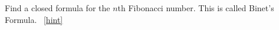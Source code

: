 \documentclass{book}
\begin{document}
\setcounter{project}{150}
\addtocounter{project}{-1}
\begin{activity}[]\label{act-binet}
\hypertarget{p-1007}{}%
Find a closed formula for the \(n\)th Fibonacci number.  This is called Binet's Formula.%
~\hfill{\tiny\hyperlink{a-150}{[hint]}\hypertarget{q-150}{}}\end{activity}
\end{document}
